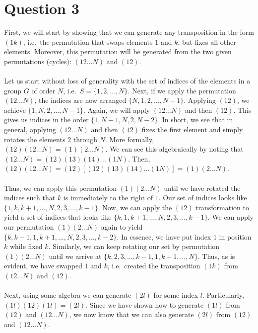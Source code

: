 \documentclass[letterpaper]{article}
\begin{document}
\section{Question 3}
\label{sec:Question3}

First, we will start by showing that we can generate any transposition in the form $ (1k) $, i.e.\ the permutation that swaps elements $ 1 $ and $ k $, but fixes all other elements.
Moreover, this permutation will be generated from the two given permutations (cycles): $ (12 \ldots N) $ and $ (12) $.
\\ \\
Let us start without loss of generality with the set of indices of the elements in a group $ G $ of order $ N $, i.e.\ $ S = \{1, 2, \ldots, N\} $.
Next, if we apply the permutation $ (12 \ldots N) $, the indices are now arranged $ \{N, 1, 2, \ldots, N - 1\} $.
Applying $ (12) $, we achieve $ \{1, N, 2, \ldots, N - 1\} $.
Again, we will apply $ (12 \ldots N) $ and then $ (12) $.
This gives us indices in the order $ \{1, N - 1, N, 2, N - 2\} $.
In short, we see that in general, applying $ (12 \ldots N) $ and then $ (12) $ fixes the first element and simply rotates the elements $ 2 $ through $ N $.
More formally, $ (12)(12 \ldots N) = (1)(2 \ldots N) $.
We can see this algebraically by noting that $ (12 \ldots N) = (12)(13)(14)\ldots(1N) $.
Then, $ (12)(12 \ldots N) = (12)[(12)(13)(14)\ldots(1N)] = (1)(2 \ldots N) $.
\\ \\
Thus, we can apply this permutation $ (1)(2 \ldots N) $ until we have rotated the indices such that $ k $ is immediately to the right of $ 1 $.
Our set of indices looks like $ \{1, k, k + 1, \ldots, N, 2, 3, \ldots, k - 1\} $.
Now, we can apply the $ (12) $ transformation to yield a set of indices that looks like $ \{k, 1, k + 1, \ldots, N, 2, 3, \ldots, k - 1\} $.
We can apply our permutation $ (1)(2 \ldots N) $ again to yield $ \{k, k - 1, 1, k + 1, \ldots, N, 2, 3, \ldots, k - 2 \} $.
In essence, we have put index $ 1 $ in position $ k $ while fixed $ k $.
Similarly, we can keep rotating our set by permutation $ (1)(2 \ldots N) $ until we arrive at $ \{k, 2, 3, \ldots, k - 1, 1, k + 1, \ldots, N\} $.
Thus, as is evident, we have swapped $ 1 $ and $ k $, i.e.\ created the transposition $ (1k) $ from $ (12 \ldots N) $ and $ (12) $.
\\ \\
Next, using some algebra we can generate $ (2l) $ for some index $ l $.
Particularly, $ (1l)(12)(1l) = (2l) $.
Since we have shown how to generate $ (1l) $ from $ (12) $ and $ (12 \ldots N) $, we now know that we can also generate $ (2l) $ from $ (12) $ and $ (12 \ldots N) $.
\end{document}
